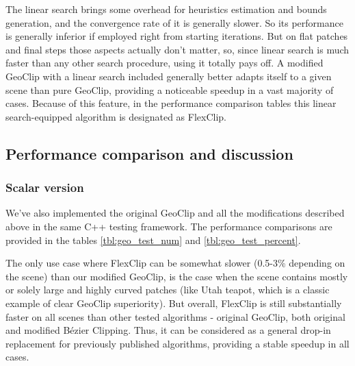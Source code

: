 \documentclass{jcgt}
\begin{document}
The linear search brings some overhead for heuristics estimation and bounds generation, and the convergence rate of it is generally slower. So its performance is generally inferior if employed right from starting iterations. But on flat patches and final steps those aspects actually don't matter, so, since linear search is much faster than any other search procedure, using it totally pays off. A modified GeoClip with a linear search included generally better adapts itself to a given scene than pure GeoClip, providing a noticeable speedup in a vast majority of cases. Because of this feature, in the performance comparison tables this linear search-equipped algorithm is designated as FlexClip.

\subsection{Performance comparison and discussion}
\subsubsection{Scalar version}
We've also implemented the original GeoClip and all the modifications described above in the same C++ testing framework.
The performance comparisons are provided in the tables \ref{tbl:geo_test_num} and \ref{tbl:geo_test_percent}.

The only use case where FlexClip can be somewhat slower (0.5-3\% depending on the scene) than our modified GeoClip, is the case when the scene contains mostly or solely large and highly curved patches (like Utah teapot, which is a classic example of clear GeoClip superiority). But overall, FlexClip is still substantially faster on all scenes than other tested algorithms - original GeoClip, both original and modified Bézier Clipping. Thus, it can be considered as a general drop-in replacement for previously published algorithms, providing a stable speedup in all cases.
\end{document}
